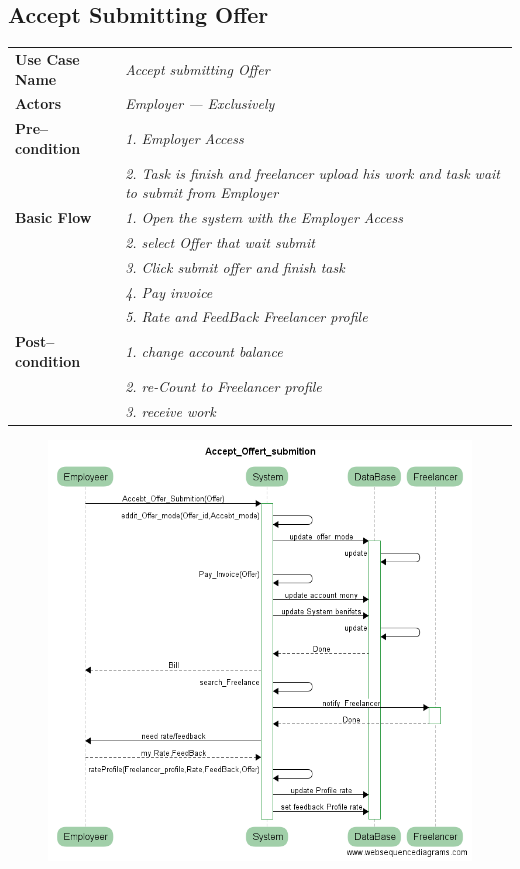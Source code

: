 \documentclass{article}
\begin{document}
\newpage
\subsection{Accept Submitting Offer}
    \begin{tabular}{ l | l }
    \toprule
      \rowcolor{LightCyan}
      \textbf{Use Case Name}    & \textit{Accept submitting Offer}\\
      \textbf{Actors}           & \textit{Employer --- Exclusively}\\
      \rowcolor{LightCyan}
      \textbf{Pre--condition}   & \textit{1. Employer Access}\\
                                & \textit{2. Task is finish and freelancer upload his work and task wait to submit from Employer}\\
      \textbf{Basic Flow}       & \textit{1. Open the system with the Employer Access}\\
                                & \textit{2. select Offer that wait submit}\\
                                & \textit{3. Click submit offer and finish task}\\
                                & \textit{4. Pay invoice}\\
				& \textit{5. Rate and FeedBack Freelancer profile}\\
      \rowcolor{LightCyan}
      \textbf{Post--condition}  & \textit{1. change account balance}\\
                                & \textit{2. re-Count to Freelancer profile}\\
                                & \textit{3. receive work}\\
    \toprule
    \end{tabular}

\begin{figure}[ht!]
\centering
\includegraphics[width=128mm]{Accept_Offert_submition_usecase.png}
\end{figure}
\end{document}
